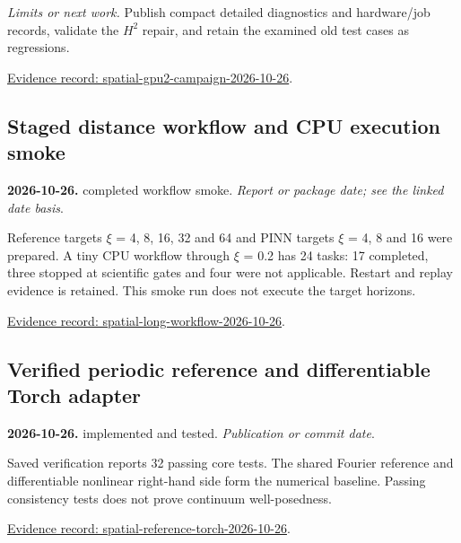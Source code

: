 \documentclass[11pt]{article}
\begin{document}
\noindent\textit{Limits or next work.} Publish compact detailed diagnostics and hardware/job records, validate the $H^2$ repair, and retain the examined old test cases as regressions.

\noindent\href{https://github.com/matasvai/dysthe-paper/blob/codex/research-record-2026-11-05/research-record/2026-11-05/README.md#spatial-gpu2-campaign-2026-10-26}{Evidence record: spatial-gpu2-campaign-2026-10-26}.
\subsection*{Staged distance workflow and CPU execution smoke}
\noindent\textbf{2026-10-26.} completed workflow smoke. \emph{Report or package date; see the linked date basis}.\par
Reference targets $\xi$ = 4, 8, 16, 32 and 64 and PINN targets $\xi$ = 4, 8 and 16 were prepared. A tiny CPU workflow through $\xi$ = 0.2 has 24 tasks: 17 completed, three stopped at scientific gates and four were not applicable. Restart and replay evidence is retained. This smoke run does not execute the target horizons.

\noindent\href{https://github.com/matasvai/dysthe-paper/blob/codex/research-record-2026-11-05/research-record/2026-11-05/README.md#spatial-long-workflow-2026-10-26}{Evidence record: spatial-long-workflow-2026-10-26}.
\subsection*{Verified periodic reference and differentiable Torch adapter}
\noindent\textbf{2026-10-26.} implemented and tested. \emph{Publication or commit date}.\par
Saved verification reports 32 passing core tests. The shared Fourier reference and differentiable nonlinear right-hand side form the numerical baseline. Passing consistency tests does not prove continuum well-posedness.

\noindent\href{https://github.com/matasvai/dysthe-paper/blob/codex/research-record-2026-11-05/research-record/2026-11-05/README.md#spatial-reference-torch-2026-10-26}{Evidence record: spatial-reference-torch-2026-10-26}.
\end{document}
